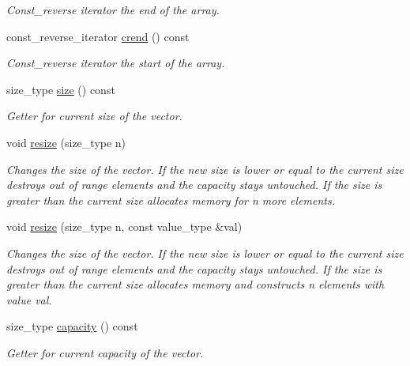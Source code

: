 \begin{DoxyCompactItemize}
\begin{DoxyCompactList}\small\item\em Const\+\_\+reverse iterator the end of the array. \end{DoxyCompactList}\item 
const\+\_\+reverse\+\_\+iterator \mbox{\hyperlink{classfake_1_1vector_adf391e72aed746a40ac380aaf70a32d8}{crend}} () const
\begin{DoxyCompactList}\small\item\em Const\+\_\+reverse iterator the start of the array. \end{DoxyCompactList}\item 
size\+\_\+type \mbox{\hyperlink{classfake_1_1vector_ad523b22d3c2200602a0b0439b69e6f46}{size}} () const
\begin{DoxyCompactList}\small\item\em Getter for current size of the vector. \end{DoxyCompactList}\item 
void \mbox{\hyperlink{classfake_1_1vector_a1c67c134cdc8d365af937918c9fc2a61}{resize}} (size\+\_\+type n)
\begin{DoxyCompactList}\small\item\em Changes the size of the vector. If the new size is lower or equal to the current size destroys out of range elements and the capacity stays untouched. If the size is greater than the current size allocates memory for n more elements. \end{DoxyCompactList}\item 
void \mbox{\hyperlink{classfake_1_1vector_ac41805c48307fdd9630c62dc1ca10259}{resize}} (size\+\_\+type n, const value\+\_\+type \&val)
\begin{DoxyCompactList}\small\item\em Changes the size of the vector. If the new size is lower or equal to the current size destroys out of range elements and the capacity stays untouched. If the size is greater than the current size allocates memory and constructs n elements with value val. \end{DoxyCompactList}\item 
size\+\_\+type \mbox{\hyperlink{classfake_1_1vector_ac6314c74adfdadd78ade4d4db2ea3e15}{capacity}} () const
\begin{DoxyCompactList}\small\item\em Getter for current capacity of the vector. \end{DoxyCompactList}\item 

\end{DoxyCompactItemize}
